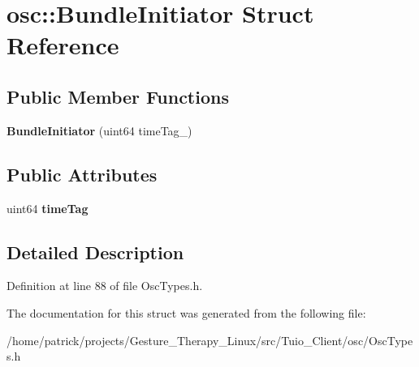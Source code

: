 \hypertarget{structosc_1_1_bundle_initiator}{}\section{osc\+:\+:Bundle\+Initiator Struct Reference}
\label{structosc_1_1_bundle_initiator}
\subsection*{Public Member Functions}
\begin{DoxyCompactItemize}
\item 
\mbox{\label{structosc_1_1_bundle_initiator_a1be9a5d43b83c9cafc0b3c25b805f7aa}} 
{\bfseries Bundle\+Initiator} (uint64 time\+Tag\+\_\+)
\end{DoxyCompactItemize}
\subsection*{Public Attributes}
\begin{DoxyCompactItemize}
\item 
\mbox{\label{structosc_1_1_bundle_initiator_abf61e94a95a2adb5135a1feb92cb040d}} 
uint64 {\bfseries time\+Tag}
\end{DoxyCompactItemize}


\subsection{Detailed Description}


Definition at line 88 of file Osc\+Types.\+h.



The documentation for this struct was generated from the following file\+:\begin{DoxyCompactItemize}
\item 
/home/patrick/projects/\+Gesture\+\_\+\+Therapy\+\_\+\+Linux/src/\+Tuio\+\_\+\+Client/osc/Osc\+Types.\+h\end{DoxyCompactItemize}
